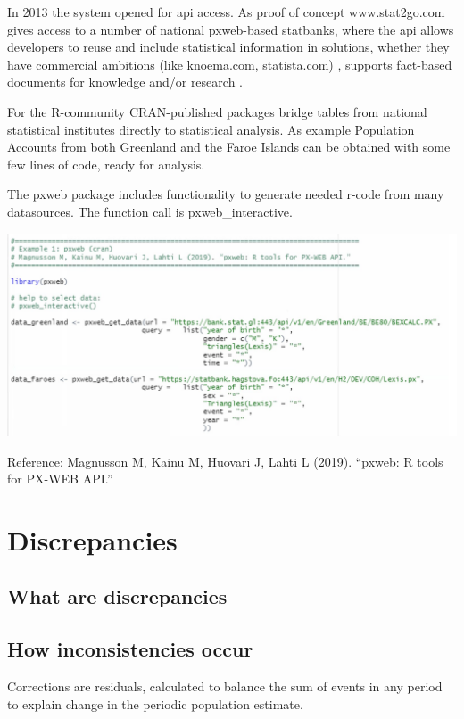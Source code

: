 \documentclass[USenglish]{article}
\begin{document}
In 2013 the system opened for api access. As proof of concept www.stat2go.com gives access to a number of national pxweb-based statbanks, where the api allows developers to reuse and include statistical information in solutions, whether they have commercial ambitions (like knoema.com, statista.com) , supports fact-based documents for knowledge and/or research .

For the R-community CRAN-published packages bridge tables from national statistical institutes directly to statistical analysis. As example Population Accounts from both Greenland and the Faroe Islands can be obtained with some few lines of code, ready for analysis.

The pxweb package includes functionality to generate needed r-code from many datasources. The function call is pxweb\_interactive.


\includegraphics[scale=0.22]{images/pxwebR_GF.png}


Reference: Magnusson M, Kainu M, Huovari J, Lahti L (2019). “pxweb: R tools for PX-WEB API.”


\section{Discrepancies}

\subsection{What are discrepancies}



\subsection{How inconsistencies occur}

Corrections are residuals, calculated to balance the sum of events in any period to explain change in the periodic population estimate.
\end{document}

